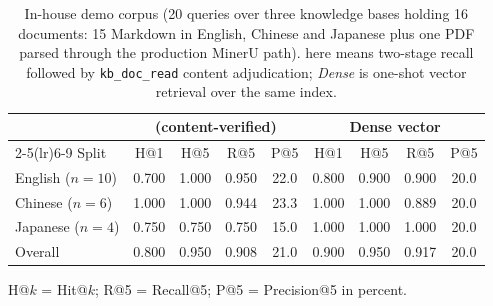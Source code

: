 \begin{table}[t]
\centering
\footnotesize
\setlength{\tabcolsep}{3.2pt}
\caption{In-house demo corpus (20 queries over three knowledge bases holding 16
documents: 15 Markdown in English, Chinese and Japanese plus one PDF parsed
through the production MinerU path). \sys{} here means two-stage recall followed
by \texttt{kb\_doc\_read} content adjudication; \emph{Dense} is one-shot vector
retrieval over the same index.}
\label{tab:inhouse}
\begin{tabular}{@{}lcccccccc@{}}
\toprule
& \multicolumn{4}{c}{\sys{} (content-verified)} & \multicolumn{4}{c}{Dense vector} \\
\cmidrule(lr){2-5}\cmidrule(lr){6-9}
Split & H@1 & H@5 & R@5 & P@5 & H@1 & H@5 & R@5 & P@5 \\
\midrule
English ($n{=}10$) & 0.700 & 1.000 & 0.950 & 22.0 & 0.800 & 0.900 & 0.900 & 20.0 \\
Chinese ($n{=}6$) & 1.000 & 1.000 & 0.944 & 23.3 & 1.000 & 1.000 & 0.889 & 20.0 \\
Japanese ($n{=}4$) & 0.750 & 0.750 & 0.750 & 15.0 & 1.000 & 1.000 & 1.000 & 20.0 \\
\midrule Overall & 0.800 & 0.950 & 0.908 & 21.0 & 0.900 & 0.950 & 0.917 & 20.0 \\
\bottomrule
\end{tabular}

\vspace{2pt}
\parbox{\columnwidth}{\scriptsize H@$k$ = Hit@$k$; R@5 = Recall@5;
P@5 = Precision@5 in percent.}
\end{table}

